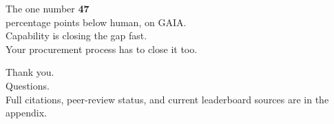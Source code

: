 \documentclass[aspectratio=169, 12pt, xcolor={dvipsnames,table}]{beamer}
\newcommand{\bignum}[1]{{\fontsize{60}{66}\selectfont\bfseries\color{accent}#1}}
\begin{document}
\begin{frame}{The one number}
  \vfill
  \centering
  \bignum{47}\\[0.4em]
  {\large percentage points below human, on GAIA.}\\[2em]
  {\color{mute}Capability is closing the gap fast.}\\[0.4em]
  {\color{mute}Your procurement process has to close it too.}
  \vfill
\end{frame}

\begin{frame}[plain]
  \vfill
  \centering
  {\Huge Thank you.}\\[1em]
  {\large Questions.}\\[2em]
  {\small\color{mute}Full citations, peer-review status, and current leaderboard sources are in the appendix.}
  \vfill
\end{frame}

\appendix
\end{document}
